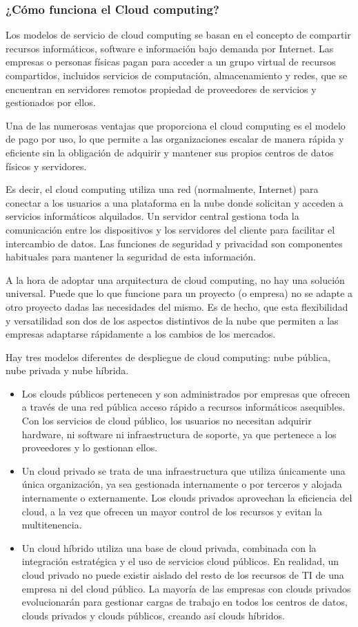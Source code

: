 \subsubsection{¿Cómo funciona el Cloud computing?}
Los modelos de servicio de cloud computing se basan en el concepto de compartir recursos informáticos, software e información bajo demanda por Internet. Las empresas o personas físicas pagan para acceder a un grupo virtual de recursos compartidos, incluidos servicios de computación, almacenamiento y redes, que se encuentran en servidores remotos propiedad de proveedores de servicios y gestionados por ellos.

Una de las numerosas ventajas que proporciona el cloud computing es el modelo de pago por uso, lo que permite a las organizaciones escalar de manera rápida y eficiente sin la obligación de adquirir y mantener sus propios centros de datos físicos y servidores.

Es decir, el cloud computing utiliza una red (normalmente, Internet) para conectar a los usuarios a una plataforma en la nube donde solicitan y acceden a servicios informáticos alquilados. Un servidor central gestiona toda la comunicación entre los dispositivos y los servidores del cliente para facilitar el intercambio de datos. Las funciones de seguridad y privacidad son componentes habituales para mantener la seguridad de esta información.

A la hora de adoptar una arquitectura de cloud computing, no hay una solución universal. Puede que lo que funcione para un proyecto (o empresa) no se adapte a otro proyecto dadas las necesidades del mismo. Es de hecho, que esta flexibilidad y versatilidad son dos de los aspectos distintivos de la nube que permiten a las empresas adaptarse rápidamente a los cambios de los mercados.

Hay tres modelos diferentes de despliegue de cloud computing: nube pública, nube privada y nube híbrida.
\begin{itemize}
    \item Los clouds públicos pertenecen y son administrados por empresas que ofrecen a través de una red pública acceso rápido a recursos informáticos asequibles. Con los servicios de cloud público, los usuarios no necesitan adquirir hardware, ni software ni infraestructura de soporte, ya que pertenece a los proveedores y lo gestionan ellos.
    \item Un cloud privado se trata de una infraestructura que utiliza únicamente una única organización, ya sea gestionada internamente o por terceros y alojada internamente o externamente. Los clouds privados aprovechan la eficiencia del cloud, a la vez que ofrecen un mayor control de los recursos y evitan la multitenencia.
    \item Un cloud híbrido utiliza una base de cloud privada, combinada con la integración estratégica y el uso de servicios cloud públicos. En realidad, un cloud privado no puede existir aislado del resto de los recursos de TI de una empresa ni del cloud público. La mayoría de las empresas con clouds privados evolucionarán para gestionar cargas de trabajo en todos los centros de datos, clouds privados y clouds públicos, creando así clouds híbridos.
\end{itemize}

